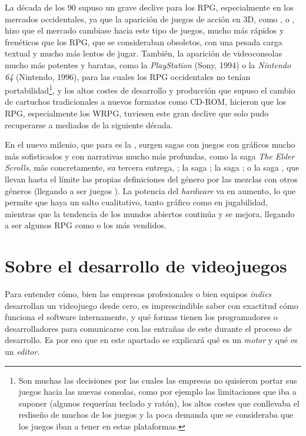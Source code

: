 \medskip

La década de los 90 supuso un grave declive para los RPG, especialmente en los mercados occidentales, ya que la aparición de juegos de acción en 3D, como ,  o , hizo que el mercado cambiase hacia este tipo de juegos, mucho más rápidos y frenéticos que los RPG, que se consideraban obsoletos, con una pesada carga textual y mucho más lentos de jugar. También, la aparición de videoconsolas mucho más potentes y baratas, como la \textit{PlayStation} (Sony, 1994) o la \textit{Nintendo 64} (Nintendo, 1996), para las cuales los RPG occidentales no tenían portabilidad\footnote{Son muchas las decisiones por las cuales las empresas  no quisieron portar sus juegos hacia las nuevas consolas, como por ejemplo las limitaciones que iba a suponer (algunos requerían teclado y ratón), los altos costes que conllevaba el rediseño de muchos de los juegos y la poca demanda que se consideraba que los juegos iban a tener en estas plataformas.}, y los altos costes de desarrollo y producción que supuso el cambio de cartuchos tradicionales a nuevos formatos como CD-ROM, hicieron que los RPG, especialmente los WRPG, tuviesen este gran declive que solo pudo recuperarse a mediados de la siguiente década.

\medskip

En el nuevo milenio, que para \citeauthor{barton2008dungeons} es la , surgen sagas con juegos con gráficos mucho más sofisticados y con narrativas mucho más profundas, como la saga \textit{The Elder Scrolls}, más concretamente, su tercera entrega, ; la saga ; la saga ; o la saga , que llevan hasta el límite las propias definiciones del género por las mezclas con otros géneros (llegando a ser juegos ). La potencia del \textit{hardware} va en aumento, lo que permite que haya un salto cualitativo, tanto gráfico como en jugabilidad, mientras que la tendencia de los mundos abiertos continúa y se mejora, llegando a ser algunos RPG como  o  los más vendidos.

\section{Sobre el desarrollo de videojuegos}
Para entender cómo, bien las empresas profesionales o bien equipos \textit{indies} desarrollan un videojuego desde cero, es imprescindible saber con exactitud cómo funciona el software internamente, y qué formas tienen los programadores o desarrolladores para comunicarse con las entrañas de este durante el proceso de desarrollo. Es por eso que en este apartado se explicará qué es un \textit{motor} y qué es un \textit{editor}.

